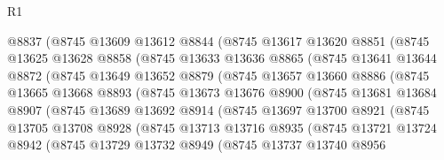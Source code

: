 \begin{lexlean}{R1}
\begin{coremodule}
              @8837
              (@8745
                @13609
                @13612
                @8844
                (@8745
                  @13617
                  @13620
                  @8851
                  (@8745
                    @13625
                    @13628
                    @8858
                    (@8745
                      @13633
                      @13636
                      @8865
                      (@8745
                        @13641
                        @13644
                        @8872
                        (@8745
                          @13649
                          @13652
                          @8879
                          (@8745
                            @13657
                            @13660
                            @8886
                            (@8745
                              @13665
                              @13668
                              @8893
                              (@8745
                                @13673
                                @13676
                                @8900
                                (@8745
                                  @13681
                                  @13684
                                  @8907
                                  (@8745
                                    @13689
                                    @13692
                                    @8914
                                    (@8745
                                      @13697
                                      @13700
                                      @8921
                                      (@8745
                                        @13705
                                        @13708
                                        @8928
                                        (@8745
                                          @13713
                                          @13716
                                          @8935
                                          (@8745
                                            @13721
                                            @13724
                                            @8942
                                            (@8745
                                              @13729
                                              @13732
                                              @8949
                                              (@8745
                                                @13737
                                                @13740
                                                @8956

\end{coremodule}
\end{lexlean}
